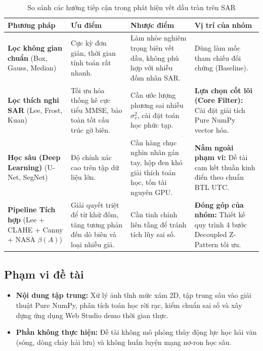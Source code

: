 \begin{table}[H]
\centering
\small
\begin{tabularx}{\textwidth}{|>{\raggedright\arraybackslash}p{2.8cm}|X|X|X|}
\hline
\textbf{Phương pháp} & \textbf{Ưu điểm} & \textbf{Nhược điểm} & \textbf{Vị trí của nhóm} \\
\hline
\textbf{Lọc không gian chuẩn} (Box, Gauss, Median) & Cực kỳ đơn giản, thời gian tính toán rất nhanh. & Làm nhòe nghiêm trọng biên vết dầu, không phù hợp với nhiễu đốm nhân SAR. & Dùng làm mốc tham chiếu đối chứng (Baseline). \\
\hline
\textbf{Lọc thích nghi SAR} (Lee, Frost, Kuan) & Tối ưu hóa thống kê cực tiểu MMSE, bảo toàn tốt cấu trúc gờ biên. & Cần ước lượng phương sai nhiễu $\sigma_v^2$, cài đặt toán học phức tạp. & \textbf{Lựa chọn cốt lõi (Core Filter):} Cài đặt giải tích Pure NumPy vector hóa. \\
\hline
\textbf{Học sâu (Deep Learning)} (U-Net, SegNet) & Độ chính xác cao trên tập dữ liệu lớn. & Cần hàng chục nghìn nhãn gán tay, hộp đen khó giải thích toán học, tốn tài nguyên GPU. & \textbf{Nằm ngoài phạm vi:} Đề tài cam kết thuần kinh điển theo chuẩn BTL UTC. \\
\hline
\textbf{Pipeline Tích hợp} (Lee + CLAHE + Canny + NASA $\beta(A)$) & Giải quyết triệt để từ khử đốm, tăng tương phản đến dò biên và loại nhiễu giả. & Cần tinh chỉnh liên tầng để tránh tích lũy sai số. & \textbf{Đóng góp của nhóm:} Thiết kế quy trình 4 bước Decoupled Z-Pattern tối ưu. \\
\hline
\end{tabularx}
\caption{So sánh các hướng tiếp cận trong phát hiện vết dầu tràn trên SAR}
\label{tab:approaches}
\end{table}

\subsection{Phạm vi đề tài}
\begin{itemize}
    \item \textbf{Nội dung tập trung:} Xử lý ảnh tĩnh mức xám 2D, tập trung sâu vào giải thuật Pure NumPy, phân tích toán học rời rạc, kiểm chuẩn sai số và xây dựng ứng dụng Web Studio demo thời gian thực.
    \item \textbf{Phần không thực hiện:} Đề tài không mô phỏng thủy động lực học hải văn (sóng, dòng chảy hải lưu) và không huấn luyện mạng nơ-ron học sâu.
\end{itemize}
